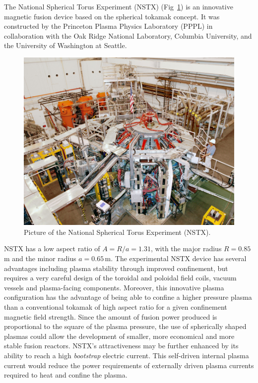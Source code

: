\documentclass[12pt,lot, lof]{puthesis}
\begin{document}
The National Spherical Torus Experiment (NSTX)  (Fig~\ref{nstx2}) is an innovative magnetic fusion device based on the spherical tokamak concept. It was constructed by the Princeton Plasma Physics Laboratory (PPPL) in collaboration with the Oak Ridge National Laboratory, Columbia University, and the University of Washington at Seattle.
\begin{figure}
\centering
\includegraphics[width= 0.9\linewidth]{nstx2}
\caption{Picture of the National Spherical Torus Experiment (NSTX).}
\label{nstx2}
\end{figure}

NSTX has a low aspect ratio of $A= R/a =1.31$, with the major radius $R =0.85$\,m and the minor radius $a =0.65$\,m.
The experimental NSTX device has several advantages including plasma stability through improved confinement, but requires a very careful design of the toroidal and poloidal field coils, vacuum vessels and plasma-facing components. Moreover, this innovative plasma configuration has the advantage of being able to confine a higher pressure plasma than a conventional tokamak of high aspect ratio for a given confinement magnetic field strength. Since the amount of fusion power produced is proportional to the square of the plasma pressure, the use of spherically shaped plasmas could allow the development of smaller, more economical and more stable fusion reactors. NSTX's attractiveness may be further enhanced by its ability to reach a high \emph{bootstrap} electric current. This self-driven internal plasma current would reduce the power requirements of externally driven plasma currents required to heat and confine the plasma.
\end{document}
